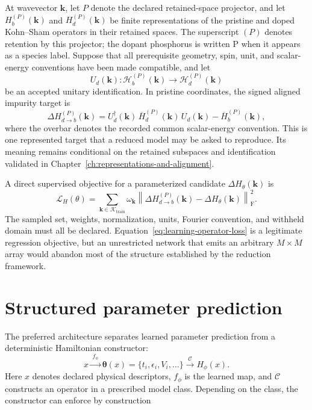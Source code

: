 At wavevector $\mathbf k$, let $P$ denote the declared retained-space
projector, and let $H_b^{(P)}(\mathbf k)$ and $H_d^{(P)}(\mathbf k)$ be finite
representations of the pristine and doped Kohn--Sham operators in their retained
spaces. The superscript $(P)$ denotes retention by this projector; the dopant
phosphorus is written $\mathrm P$ when it appears as a species label. Suppose that all prerequisite
geometry, spin, unit, and scalar-energy conventions have been made compatible,
and let
\begin{equation}
  U_d(\mathbf k):
  \mathcal H_b^{(P)}(\mathbf k)
  \longrightarrow
  \mathcal H_d^{(P)}(\mathbf k)
\end{equation}
be an accepted unitary identification. In pristine coordinates, the signed
aligned impurity target is
\begin{equation}
  \Delta H_{d\to b}^{(P)}(\mathbf k)
  =
  U_d^{\dagger}(\mathbf k)\,
  \overline H_d^{(P)}(\mathbf k)\,
  U_d(\mathbf k)
  -
  \overline H_b^{(P)}(\mathbf k),
  \label{eq:learning-aligned-target}
\end{equation}
where the overbar denotes the recorded common scalar-energy convention. This
is one represented target that a reduced model may be asked to reproduce. Its
meaning remains conditional on the retained subspaces and identification
validated in Chapter~\ref{ch:representations-and-alignment}.

A direct supervised objective for a parameterized candidate
$\Delta H_{\theta}(\mathbf k)$ is
\begin{equation}
  \mathcal L_H(\theta)
  =
  \sum_{\mathbf k\in\mathcal K_{\mathrm{train}}}
  \omega_{\mathbf k}
  \left\|
    \Delta H_{d\to b}^{(P)}(\mathbf k)
    -\Delta H_{\theta}(\mathbf k)
  \right\|_{\mathrm F}^{2}.
  \label{eq:learning-operator-loss}
\end{equation}
The sampled set, weights, normalization, units, Fourier convention, and
withheld domain must all be declared. Equation~\eqref{eq:learning-operator-loss}
is a legitimate regression objective, but an unrestricted network that emits
an arbitrary $M\times M$ array would abandon most of the structure established
by the reduction framework.

\section{Structured parameter prediction}


The preferred architecture separates learned parameter prediction from a
deterministic Hamiltonian constructor:
\begin{equation}
  x
  \xrightarrow{\;f_{\phi}\;}
  \boldsymbol\theta(x)
  =\{t_i,\epsilon_i,V_i,\ldots\}
  \xrightarrow{\;\mathcal C\;}
  H_{\phi}(x).
  \label{eq:structured-learning-map}
\end{equation}
Here $x$ denotes declared physical descriptors, $f_{\phi}$ is the learned map,
and $\mathcal C$ constructs an operator in a prescribed model class. Depending
on the class, the constructor can enforce by construction

